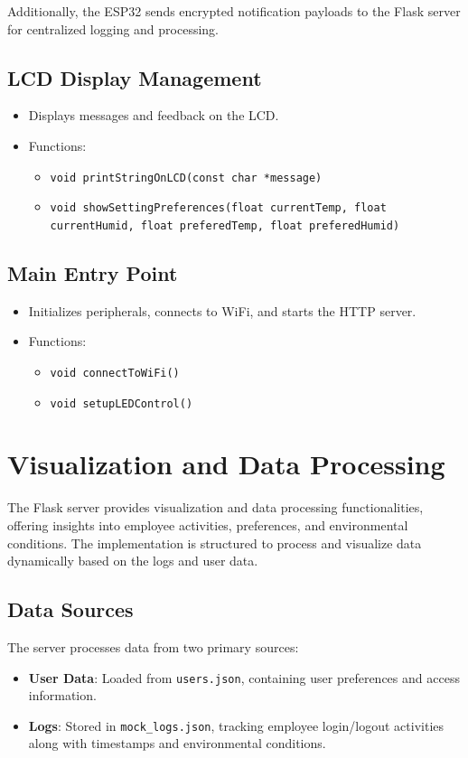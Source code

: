 \documentclass[a4paper,12pt]{report}
\begin{document}
Additionally, the ESP32 sends encrypted notification payloads to the Flask server for centralized logging and processing.

\section{LCD Display Management}
\begin{itemize}
    \item Displays messages and feedback on the LCD.
    \item Functions:
    \begin{itemize}
        \item \texttt{void printStringOnLCD(const char *message)}
        \item \texttt{void showSettingPreferences(float currentTemp, float currentHumid, float preferedTemp, float preferedHumid)}
    \end{itemize}
\end{itemize}

\section{Main Entry Point}
\begin{itemize}
    \item Initializes peripherals, connects to WiFi, and starts the HTTP server.
    \item Functions:
    \begin{itemize}
        \item \texttt{void connectToWiFi()}
        \item \texttt{void setupLEDControl()}
    \end{itemize}
\end{itemize}

\chapter{Visualization and Data Processing}

The Flask server provides visualization and data processing functionalities, offering insights into employee activities, preferences, and environmental conditions. The implementation is structured to process and visualize data dynamically based on the logs and user data.

\section{Data Sources}
The server processes data from two primary sources:
\begin{itemize}
    \item \textbf{User Data}: Loaded from \texttt{users.json}, containing user preferences and access information.
    \item \textbf{Logs}: Stored in \texttt{mock\_logs.json}, tracking employee login/logout activities along with timestamps and environmental conditions.
\end{itemize}
\end{document}
